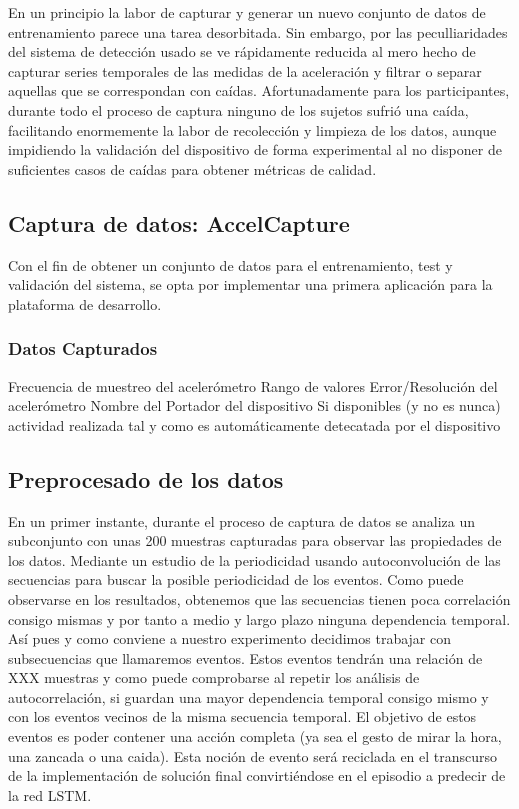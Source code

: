 \documentclass[../tfm.tex]{subfiles}
\begin{document}
En un principio la labor de capturar y generar un nuevo conjunto de datos de entrenamiento parece una tarea desorbitada. Sin embargo, por las peculliaridades del sistema de detección usado se ve rápidamente reducida al mero hecho de capturar series temporales de las medidas de la aceleración y filtrar o separar aquellas que se correspondan con caídas. Afortunadamente para los participantes, durante todo el proceso de captura ninguno de los sujetos sufrió una caída, facilitando enormemente la labor de recolección y limpieza de los datos, aunque impidiendo la validación del dispositivo de forma experimental al no disponer de suficientes casos de caídas para obtener métricas de calidad.

\subsection{Captura de datos: AccelCapture}\label{app:accelcapture}

Con el fin de obtener un conjunto de datos para el entrenamiento, test y validación del sistema, se opta por implementar una primera aplicación para la plataforma de desarrollo.



\subsubsection{Datos Capturados}

Frecuencia de muestreo del acelerómetro
Rango de valores
Error/Resolución del acelerómetro
Nombre del Portador del dispositivo
Si disponibles (y no es nunca) actividad realizada tal y como es automáticamente detecatada por el dispositivo



\subsection{Preprocesado de los datos}

En un primer instante, durante el proceso de captura de datos se analiza un subconjunto con unas 200 muestras capturadas para observar las propiedades de los datos. Mediante un estudio de la periodicidad usando autoconvolución de las secuencias para buscar la posible periodicidad de los eventos. Como puede observarse en los resultados, obtenemos que las secuencias tienen poca correlación consigo mismas y por tanto a medio y largo plazo ninguna dependencia temporal. Así pues y como conviene a nuestro experimento decidimos trabajar con subsecuencias que llamaremos eventos. Estos eventos tendrán una relación de XXX muestras y como puede comprobarse al repetir los análisis de autocorrelación, si guardan una mayor dependencia temporal consigo mismo y con los eventos vecinos de la misma secuencia temporal. El objetivo de estos eventos es poder contener una acción completa (ya sea el gesto de mirar la hora, una zancada o una caida). Esta noción de evento será reciclada en el transcurso de la implementación de solución final convirtiéndose en el episodio a predecir de la red LSTM.
\end{document}
